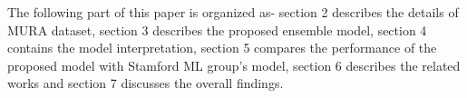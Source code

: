 \documentclass{article}
\begin{document}
The following part of this paper is organized as- section 2 describes the details of MURA dataset, section 3 describes the proposed ensemble model, section 4 contains the model interpretation, section 5 compares the performance of the proposed model with Stamford ML group's model,  section 6 describes the related works and section 7 discusses the overall findings.
\end{document}
